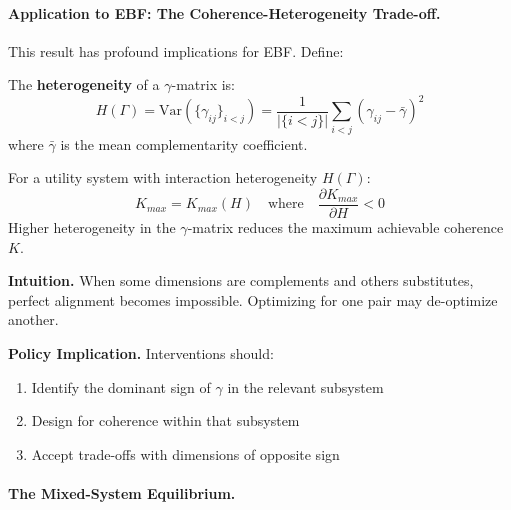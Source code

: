 \paragraph{Application to EBF: The Coherence-Heterogeneity Trade-off.}

This result has profound implications for EBF. Define:

\begin{definition}
\label{def:heterogeneity}
The \textbf{heterogeneity} of a $\gamma$-matrix is:
\begin{equation}
H(\Gamma) = \text{Var}(\{\gamma_{ij}\}_{i<j}) = \frac{1}{|\{i<j\}|} \sum_{i<j} (\gamma_{ij} - \bar{\gamma})^2
\end{equation}
where $\bar{\gamma}$ is the mean complementarity coefficient.
\end{definition}

\begin{proposition}
\label{prop:coherence-heterogeneity}
For a utility system with interaction heterogeneity $H(\Gamma)$:
\begin{equation}
K_{max} = K_{max}(H) \quad \text{where} \quad \frac{\partial K_{max}}{\partial H} < 0
\end{equation}
Higher heterogeneity in the $\gamma$-matrix reduces the maximum achievable 
coherence $K$.
\end{proposition}

\textbf{Intuition.}
When some dimensions are complements and others substitutes, perfect alignment 
becomes impossible. Optimizing for one pair may de-optimize another.

\textbf{Policy Implication.}
Interventions should:
\begin{enumerate}
    \item Identify the dominant sign of $\gamma$ in the relevant subsystem
    \item Design for coherence within that subsystem
    \item Accept trade-offs with dimensions of opposite sign
\end{enumerate}

\paragraph{The Mixed-System Equilibrium.}

